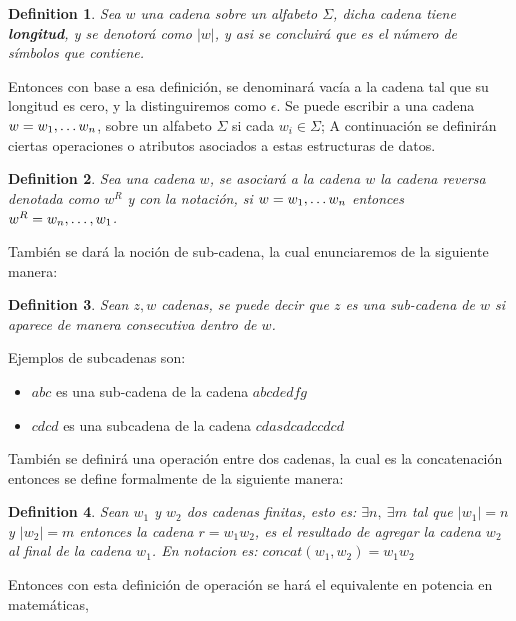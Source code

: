 \documentclass[10pt]{report}
\newtheorem{definition}{Definition}
\begin{document}
    \begin{definition}
        Sea $w$ una cadena sobre un alfabeto $\Sigma$, dicha cadena tiene \textbf{longitud},
        y se denotorá como $|w|$, y asi se concluirá que es el número de símbolos que contiene.

    \end{definition}
    Entonces con base a esa definición, se denominará vacía a la cadena tal que su longitud es cero, y la
    distinguiremos como $\epsilon$.\newline
    Se puede escribir a una cadena $w = w_{1},\mathellipsis w_{n}$, sobre un alfabeto $\Sigma$ si cada $w_{i} \in \Sigma$;
    \space
    A continuación se definirán ciertas operaciones o atributos asociados a estas estructuras de datos.
    \begin{definition}
        Sea una cadena $w$, se asociará a la cadena $w$ la cadena reversa denotada como $w^R$
        y con la notación, si $w = w_{1},\mathellipsis w_{n}$ entonces $w^{R} = w_{n},\mathellipsis,w_{1}$.
    \end{definition}
    También se dará la noción de sub-cadena, la cual enunciaremos de la siguiente manera:\newline
    \begin{definition}
        Sean $z,w$ cadenas, se puede decir que $z$ es una sub-cadena de $w$ si aparece de manera consecutiva dentro de $w$.
    \end{definition}
    Ejemplos de subcadenas son:
    \begin{itemize}
        \item $abc$ es una sub-cadena de la cadena $abcdedfg$
        \item $cdcd$ es una subcadena de la cadena $cdasdcadccdcd$
    \end{itemize}
    También se definirá una operación entre dos cadenas, la cual es
    la concatenación entonces se define formalmente de la siguiente manera:\newline
    \begin{definition}
        Sean $w_{1}$ y $w_{2}$ dos cadenas finitas, esto es:\newline
        $\exists n,\ \exists m$ tal que $|w_{1}|=n$ y $|w_{2}|=m$
        entonces la cadena $r = w_{1}w_{2}$, es el resultado de agregar la cadena $w_{2}$ al final de la cadena
        $w_{1}$.\newline
        En notacion es: $concat(w_{1},w_{2}) = w_{1}w_{2}$
    \end{definition}
    Entonces con esta definición de operación se hará el equivalente en potencia en matemáticas,
\end{document}

